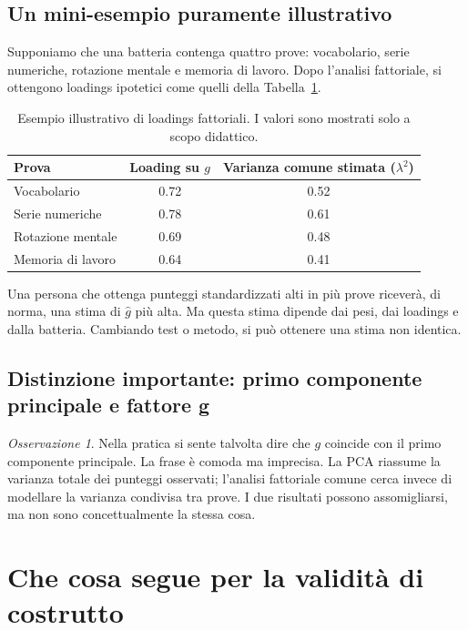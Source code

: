 \documentclass[10pt, a4paper]{article}
\theoremstyle{plain}
\theoremstyle{definition}
\theoremstyle{remark}
\newtheorem{remark}{Osservazione}
\begin{document}
\subsection{Un mini-esempio puramente illustrativo}

Supponiamo che una batteria contenga quattro prove: vocabolario, serie
numeriche, rotazione mentale e memoria di lavoro. Dopo l'analisi fattoriale, si
ottengono loadings ipotetici come quelli della Tabella~\ref{tab:loadings}.

\begin{table}[t]
    \centering
    \begin{tabular}{lcc}
        \toprule
        \textbf{Prova} & \textbf{Loading su $g$} & \textbf{Varianza comune stimata ($\lambda^2$)} \\
        \midrule
        Vocabolario & 0.72 & 0.52 \\
        Serie numeriche & 0.78 & 0.61 \\
        Rotazione mentale & 0.69 & 0.48 \\
        Memoria di lavoro & 0.64 & 0.41 \\
        \bottomrule
    \end{tabular}
    \caption{Esempio illustrativo di loadings fattoriali. I valori sono
    mostrati solo a scopo didattico.}
    \label{tab:loadings}
\end{table}

Una persona che ottenga punteggi standardizzati alti in più prove riceverà, di
norma, una stima di $\hat{g}$ più alta. Ma questa stima dipende dai pesi, dai
loadings e dalla batteria. Cambiando test o metodo, si può ottenere una stima
non identica.

\subsection{Distinzione importante: primo componente principale e fattore g}

\begin{remark}
Nella pratica si sente talvolta dire che $g$ coincide con il primo componente
principale. La frase è comoda ma imprecisa. La PCA riassume la varianza totale
dei punteggi osservati; l'analisi fattoriale comune cerca invece di modellare la
varianza condivisa tra prove. I due risultati possono assomigliarsi, ma non sono
concettualmente la stessa cosa.
\end{remark}

\section{Che cosa segue per la validità di costrutto}
\label{sec:validity}
\end{document}
